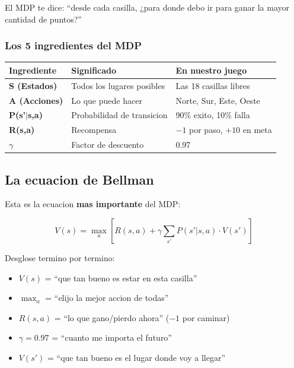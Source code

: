 \documentclass[11pt,a4paper]{article}
\begin{document}
El MDP te dice: ``desde cada casilla, ¿para donde debo ir para ganar la mayor cantidad de puntos?''

\subsubsection{Los 5 ingredientes del MDP}

\begin{center}
\begin{tabular}{>{\bfseries}l l l}
\toprule
\rowcolor{tabheader}
Ingrediente & Significado & En nuestro juego \\
\midrule
S (Estados) & Todos los lugares posibles & Las 18 casillas libres \\
A (Acciones) & Lo que puede hacer & Norte, Sur, Este, Oeste \\
P(s'$|$s,a) & Probabilidad de transicion & 90\% exito, 10\% falla \\
R(s,a) & Recompensa & $-1$ por paso, $+10$ en meta \\
$\gamma$ & Factor de descuento & 0.97 \\
\bottomrule
\end{tabular}
\end{center}

\subsection{La ecuacion de Bellman}

Esta es la ecuacion \textbf{mas importante} del MDP:

\begin{equation}
V(s) = \max_a \left[ R(s,a) + \gamma \sum_{s'} P(s'|s,a) \cdot V(s') \right]
\end{equation}

Desglose termino por termino:

\begin{importante}
\begin{itemize}
    \item $V(s)$ = ``que tan bueno es estar en esta casilla''
    \item $\max_a$ = ``elijo la mejor accion de todas''
    \item $R(s,a)$ = ``lo que gano/pierdo ahora'' ($-1$ por caminar)
    \item $\gamma = 0.97$ = ``cuanto me importa el futuro''
    \item $V(s')$ = ``que tan bueno es el lugar donde voy a llegar''
\end{itemize}
\end{importante}
\end{document}
